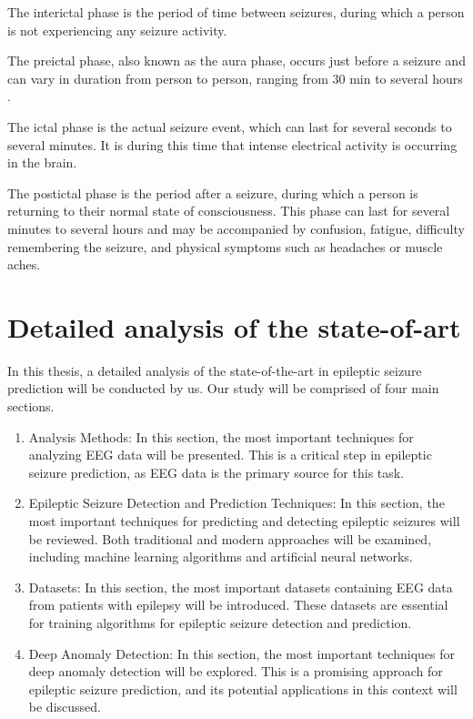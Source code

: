 The interictal phase is the period of time between seizures, during which a person is not experiencing any seizure activity. 

The preictal phase, also known as the aura phase, occurs just before a seizure and can vary in duration from person to person, ranging from 30 min to several hours \cite{scaramelli_prodromal_2009}. 

The ictal phase is the actual seizure event, which can last for several seconds to several minutes. It is during this time that intense electrical activity is occurring in the brain. 

The postictal phase is the period after a seizure, during which a person is returning to their normal state of consciousness. This phase can last for several minutes to several hours and may be accompanied by confusion, fatigue, difficulty remembering the seizure, and physical symptoms such as headaches or muscle aches.

\section{Detailed analysis of the state-of-art}

In this thesis, a detailed analysis of the state-of-the-art in epileptic seizure prediction will be conducted by us. Our study will be comprised of four main sections.

\begin{enumerate}
    \item {} Analysis Methods: In this section, the most important techniques for analyzing \gls{EEG} data will be presented. This is a critical step in epileptic seizure prediction, as \gls{EEG} data is the primary source for this task.

    \item Epileptic Seizure Detection and Prediction Techniques: In this section, the most important techniques for predicting and detecting epileptic seizures will be reviewed. Both traditional and modern approaches will be examined, including machine learning algorithms and artificial neural networks.

    \item Datasets: In this section, the most important datasets containing \gls{EEG} data from patients with epilepsy will be introduced. These datasets are essential for training algorithms for epileptic seizure detection and prediction.

    \item Deep Anomaly Detection: In this section, the most important techniques for deep anomaly detection will be explored. This is a promising approach for epileptic seizure prediction, and its potential applications in this context will be discussed.
\end{enumerate}


